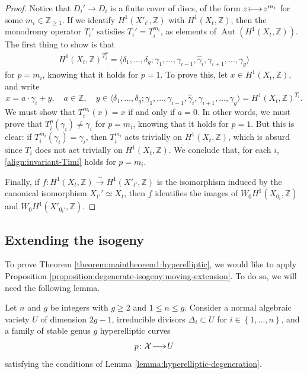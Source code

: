 \documentclass[a4paper,11pt,reqno]{amsart}
\makeatletter
\numberwithin{equation}{section}
\theoremstyle{plain}
\theoremstyle{definition}
\newcommand{\Z}{\mathbb Z}
\newcommand{\Aut}{\operatorname{Aut}}
\newcommand{\ca}[1]{{\mathcal{#1}}}
\renewcommand{\longrightarrow}{\xymatrix@1@=15pt{\ar[r]&}}
\renewcommand{\mapsto}{\xymatrix@1@=15pt{\ar@{|->}[r]&}}
\renewcommand{\cong}{\simeq}
\newcommand{\set}[1]{\left\{ #1 \right\}}
\makeatother
\begin{document}
\begin{proof}
Notice that $D_i' \to D_i$ is a finite cover of discs, of the form $z \mapsto z^{m_i}$ for some $m_i \in \Z_{\geq 1}$. 
If we identify $H^1(X'_{t'},\Z)$ with $ H^1(X_t,\Z)$, then the monodromy operator $T_i'$ satisfies $T_i' = T_i^{m_i}$, as elements of $\Aut(H^1(X_t,\Z))$. 
The first thing to show is that
\begin{align}\label{align:invariant-Timi}
 H^1(X_t,\Z)^{T_i^{p}} = \langle \delta_1, \dotsc, \delta_g; \gamma_1, \dotsc, \gamma_{i-1}, \widehat\gamma_i, \gamma_{i+1}, \dotsc, \gamma_g \rangle
\end{align}
for $p = m_i$, knowing that it holds for $p = 1$. To prove this, let $x \in H^1(X_t,\Z)$, and write 
\[
x = a \cdot \gamma_i + y, \quad a \in \Z, \quad y \in  \langle \delta_1, \dotsc, \delta_g; \gamma_1, \dotsc, \gamma_{i-1}, \widehat\gamma_i, \gamma_{i+1}, \dotsc, \gamma_g \rangle = H^1(X_t,\Z)^{T_i}. 
\]
We must show that $T_i^{m_i}(x) = x$ if and only if $a = 0$. 
In other words, we must prove that $T_i^{p}(\gamma_i) \neq \gamma_i$
for $p = m_i$, knowing that it holds for $p = 1$. But this is clear: if $T_i^{m_i}(\gamma_i) = \gamma_i$, then $T_i^{m_i}$ acts trivially on $H^1(X_t,\Z)$, which is absurd since $T_i$ does not act trivially on $H^1(X_t,\Z)$. We conclude that, for each $i$, \eqref{align:invariant-Timi} holds for $p = m_i$. 

Finally, if $f \colon H^1(X_t,\Z) \xrightarrow{\sim}  H^1(X'_{t'},\Z)$ is the isomorphism induced by the canonical isomorphism $X_{t'}'\cong X_t$, then $f$ identifies the images of $W_0H^1(X_{0_i},\Z)$ and $W_0H^1(X'_{0_i'},\Z)$. 
\end{proof}

\subsection{Extending the isogeny}
To prove Theorem \ref{theorem:maintheorem1:hyperelliptic}, we would like to apply Proposition \ref{proposition:degenerate-isogeny:moving-extension}. To do so, we will need the following lemma.  

Let $n$ and $g$ be integers with $g\geq 2$ and $1 \leq n \leq g$. 
Consider a normal algebraic variety $U$ of dimension $2g-1$, irreducible divisors $\Delta_i \subset U$ for $i \in \set{1, \dotsc, n}$, and a family of stable genus $g$ hyperelliptic curves \begin{align} \label{align:family-X-U-semi-stable}
p \colon \ca X \longrightarrow U
\end{align} satisfying the conditions of Lemma \ref{lemma:hyperelliptic-degeneration}.
\end{document}
